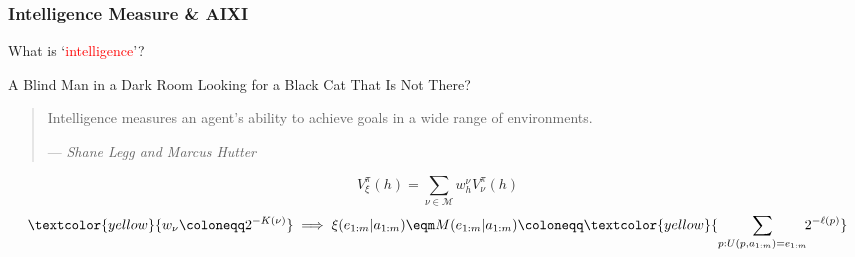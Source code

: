 \documentclass[UTF8,11pt,colorlinks,compress,openany]{beamer}%
\begin{document}
\begin{frame}\frametitle{Intelligence Measure \& AIXI}
\setlength\abovedisplayskip{0pt}
\setlength\belowdisplayskip{0pt}
	\begin{center}
		\huge What is `\textcolor{red}{intelligence}'?
	\end{center}
	\begin{center}
		A Blind Man in a Dark Room Looking for a Black Cat That Is Not There?
	\end{center}
	\begin{quote}
		Intelligence measures an agent's ability to achieve goals in a wide range of environments.\par
		\hfill --- \textsl{Shane Legg and Marcus Hutter}
	\end{quote}
	\begin{center}
	\end{center}
	\[V_\xi^\pi(h)=\sum\limits_{\nu\in\mathcal{M}}w_h^\nu V_\nu^\pi(h)\]
	\[\textcolor{yellow}{w_\nu\coloneqq 2^{-K(\nu)}}\implies\xi(e_{1:m}|a_{1:m})\eqm M(e_{1:m}|a_{1:m})\coloneqq \textcolor{yellow}{\sum\limits_{p:U(p,a_{1:m})=e_{1:m}}\!\!2^{-\ell(p)}}\]
\end{frame}
\end{document}

